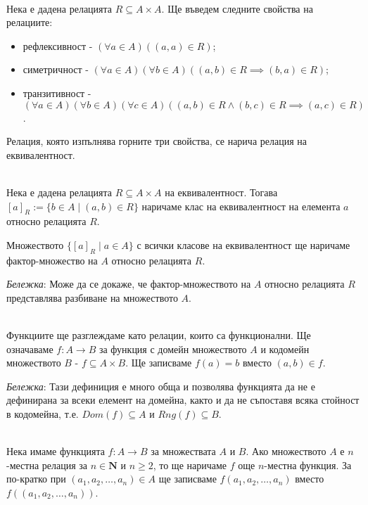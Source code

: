 \documentclass[12pt,twoside,a4paper]{article}
\begin{document}
	\begin{definitions}~\\
		\indent Нека е дадена релацията $R \subseteq A \times A$. Ще въведем следните свойства на релациите:
		\begin{itemize}
			\item рефлексивност - $(\forall a \in A)((a,a) \in R)$;
			\item симетричност - $(\forall a \in A)(\forall b \in A)((a,b) \in R \implies (b,a) \in R)$;
			\item транзитивност - $(\forall a \in A)(\forall b \in A)(\forall c \in A)((a,b) \in R \land (b,c) \in R \implies (a,c) \in R)$.
		\end{itemize}
		
		Релация, която изпълнява горните три свойства, се нарича релация на еквивалентност.
	\end{definitions}
	
	\begin{definitions}~\\
		\indent Нека е дадена релацията $R \subseteq A \times A$ на еквивалентност. Тогава $[a]_R := \{b \in A \mid (a,b) \in R\}$ наричаме клас на еквивалентност на елемента $a$ относно релацията $R$.
		
		Множеството $\{[a]_R \mid a \in A\}$ с всички класове на еквивалентност ще наричаме фактор-множество на $A$ относно релацията $R$.
		
		\textit{Бележка}: Може да се докаже, че фактор-множеството на $A$ относно релацията $R$ представлява разбиване на множеството $A$.
	\end{definitions}
	
	\begin{definition}[функция]~\\
		\indent Функциите ще разглеждаме като релации, които са функционални. Ще означаваме $f \colon A \to B$ за функция с домейн множеството $A$ и кодомейн множеството $B$ - $f \subseteq A \times B$. Ще записваме $f(a)=b$ вместо $(a,b) \in f$.
		
		\textit{Бележка}: Тази дефиниция е много обща и позволява функцията да не е дефинирана за всеки елемент на домейна, както и да не съпоставя всяка стойност в кодомейна, т.е. $Dom(f) \subseteq A$ и $Rng(f) \subseteq B$.
	\end{definition}
	
	\begin{definition}~\\
		\indent Нека имаме функцията $f \colon A \to B$ за множествата $A$ и $B$. Ако множеството $A$ е $n$-местна релация за $n \in \mathbf{N}$ и $n \ge 2$, то ще наричаме $f$ още $n$-местна функция. За по-кратко при $(a_1, a_2, \dots, a_n) \in A$ ще записваме $f(a_1, a_2, \dots, a_n)$ вместо $f((a_1, a_2, \dots, a_n))$.
	\end{definition}
	
\end{document}
